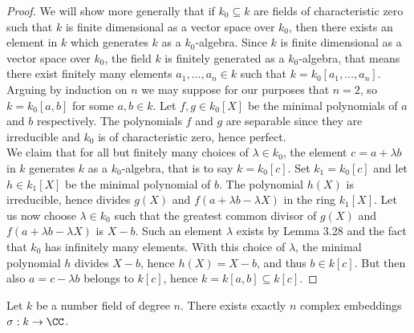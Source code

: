 \documentclass[12pt, a4paper]{article}
\begin{document}
\begin{proof}
    We will show more generally that if \( k_0 \subseteq k \) are fields of characteristic zero such that \( k \) is finite dimensional as a vector space over \( k_0 \), then there exists an element in \( k \) which generates \( k \) as a \( k_0 \)-algebra. Since \( k \) is finite dimensional as a vector space over \( k_0 \), the field \( k \) is finitely generated as a \( k_0 \)-algebra, that means there exist finitely many elements \( a_1, \ldots, a_n \in k \) such that \( k = k_0[a_1, \ldots, a_n] \). Arguing by induction on \( n \) we may suppose for our purposes that \( n = 2 \), so \( k = k_0[a, b] \) for some \( a, b \in k \). Let \( f, g \in k_0[X] \) be the minimal polynomials of \( a \) and \( b \) respectively. The polynomials \( f \) and \( g \) are separable since they are irreducible and \( k_0 \) is of characteristic zero, hence perfect. \\
    We claim that for all but finitely many choices of \( \lambda \in k_0 \), the element \( c = a + \lambda b \) in \( k \) generates \( k \) as a \( k_0 \)-algebra, that is to say \( k = k_0[c] \). Set \( k_1 = k_0[c] \) and let \( h \in k_1[X] \) be the minimal polynomial of \( b \). The polynomial \( h(X) \) is irreducible, hence divides \( g(X) \) and \( f(a + \lambda b - \lambda X) \) in the ring \( k_1[X] \). Let us now choose \( \lambda \in k_0 \) such that the greatest common divisor of \( g(X) \) and \( f(a + \lambda b - \lambda X) \) is \( X - b \). Such an element \( \lambda \) exists by Lemma 3.28 and the fact that \( k_0 \) has infinitely many elements. With this choice of \( \lambda \), the minimal polynomial \( h \) divides \( X - b \), hence \( h(X) = X - b \), and thus \( b \in k[c] \). But then also \( a = c - \lambda b \) belongs to \( k[c] \), hence \( k = k[a, b] \subseteq k[c] \). 
\end{proof}

\begin{mdcor}
    Let \(k\) be a number field of degree \(n\). There exists exactly \(n\) complex embeddings \(\sigma:k\to \CC\).
\end{mdcor}
\end{document}

